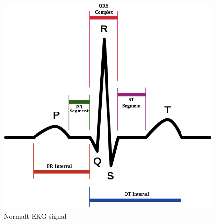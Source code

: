 \begin{figure}[htb]
	\centering
	\includegraphics[width=1\textwidth]{Figurer/Snip20150412_36}
	\caption{Normalt EKG-signal}
\end{figure}


